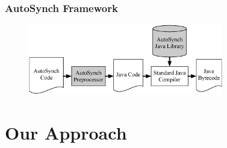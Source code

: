 \documentclass[mathserif,14pt,xcolor=table]{beamer}
\begin{document}

\begin{frame}[fragile]
    \frametitle{AutoSynch Framework}
    \begin{figure}[ht!]
        \centering
        \includegraphics[width=85mm]{fig/flow.eps}
        \label{fig:fw}
    \end{figure}
         
\end{frame}


\section{Our Approach}
\end{document}
